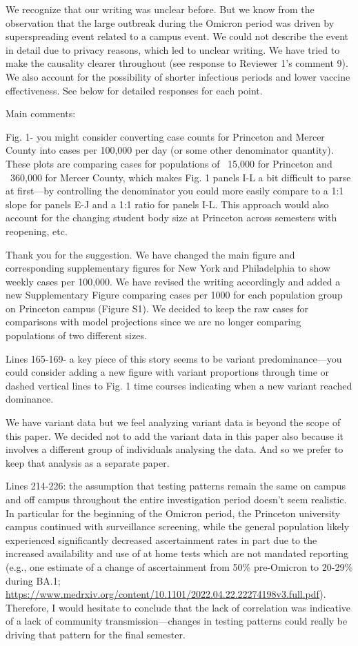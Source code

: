 \documentclass[12pt]{article}
\newcommand{\revtext}{\textsf}
\begin{document}
We recognize that our writing was unclear before.
But we know from the observation that the large outbreak during the Omicron period was driven by superspreading event related to a campus event.
We could not describe the event in detail due to privacy reasons, which led to unclear writing. 
We have tried to make the causality clearer throughout (see response to Reviewer 1's comment 9).
We also account for the possibility of shorter infectious periods and lower vaccine effectiveness.
See below for detailed responses for each point.

\revtext{Main comments:}

\revtext{Fig. 1- you might consider converting case counts for Princeton and Mercer County into cases per 100,000 per day (or some other denominator quantity). These plots are comparing cases for populations of ~15,000 for Princeton and ~360,000 for Mercer County, which makes Fig. 1 panels I-L a bit difficult to parse at first—by controlling the denominator you could more easily compare to a 1:1 slope for panels E-J and a 1:1 ratio for panels I-L. This approach would also account for the changing student body size at Princeton across semesters with reopening, etc.}

Thank you for the suggestion. 
We have changed the main figure and corresponding supplementary figures for New York and Philadelphia to show weekly cases per 100,000.
We have revised the writing accordingly and added a new Supplementary Figure comparing cases per 1000 for each population group on Princeton campus (Figure S1).
We decided to keep the raw cases for comparisons with model projections since we are no longer comparing populations of two different sizes.

\revtext{Lines 165-169- a key piece of this story seems to be variant predominance—you could consider adding a new figure with variant proportions through time or dashed vertical lines to Fig. 1 time courses indicating when a new variant reached dominance.}

We have variant data but we feel analyzing variant data is beyond the scope of this paper.
We decided not to add the variant data in this paper also because it involves a different group of individuals analysing the data.
And so we prefer to keep that analysis as a separate paper.

\revtext{Lines 214-226: the assumption that testing patterns remain the same on campus and off campus throughout the entire investigation period doesn’t seem realistic. In particular for the beginning of the Omicron period, the Princeton university campus continued with surveillance screening, while the general population likely experienced significantly decreased ascertainment rates in part due to the increased availability and use of at home tests which are not mandated reporting (e.g., one estimate of a change of ascertainment from 50\% pre-Omicron to 20-29\% during BA.1; \url{https://www.medrxiv.org/content/10.1101/2022.04.22.22274198v3.full.pdf}). Therefore, I would hesitate to conclude that the lack of correlation was indicative of a lack of community transmission—changes in testing patterns could really be driving that pattern for the final semester.}
\end{document}
